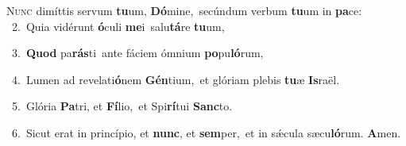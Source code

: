 \lettrine{\initial\textcolor{\initialcolor}{N}}{unc} dimíttis servum \textbf{tu}\-um, \textbf{Dó}\-mine,~\star secúndum verbum \textbf{tu}\-um in \textbf{pa}\-ce:\\
{\numbfont\textcolor{\numbcolor}{~2.}}~Quia vidérunt \textbf{ó}\-culi \textbf{me}\-i~\star salu\-\textbf{tá}\-re \textbf{tu}\-um,\par
{\numbfont\textcolor{\numbcolor}{~3.}}~\textbf{Quod} pa\-\textbf{rás}\-ti~\star ante fáciem ómnium \textbf{po}\-pu\-\textbf{ló}\-rum,\par
{\numbfont\textcolor{\numbcolor}{~4.}}~Lumen ad revelati\-\textbf{ó}\-nem \textbf{Gén}\-tium,~\star et glóriam plebis \textbf{tu}\-æ \textbf{Is}\-raël.\par
{\numbfont\textcolor{\numbcolor}{~5.}}~Glória \textbf{Pa}\-tri, et \textbf{Fí}\-lio,~\star et Spi\-\textbf{rí}\-tui \textbf{Sanc}\-to.\par
{\numbfont\textcolor{\numbcolor}{~6.}}~Sicut erat in princípio, et \textbf{nunc}\-, et \textbf{sem}\-per,~\star et in sǽcula sæcu\-\textbf{ló}\-rum. \textbf{A}\-men.\par
